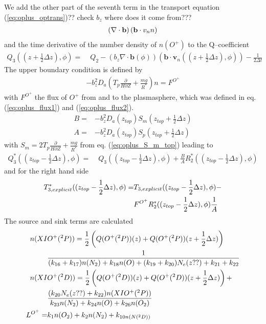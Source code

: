 %
We add the other part of the seventh term in the transport equation
(\ref{eq:oplus_optrans})?? check $b_z$ where does it come from???
%
\begin{align}
\left(\nabla \cdot
  \mathbf{b} \right)(\mathbf{b}\cdot{v}_n n) \notag
\end{align}
%
and the time derivative of the number density of $n(O^+)$ to the
Q--coefficient
%
\begin{align}
 Q_3((z+\frac{1}{2}\Delta z),\phi) = & \; Q_2 - (b_z \nabla \cdot
 \mathbf{b}(\phi))
 (\mathbf{b} \cdot \mathbf{v}_n((z+\frac{1}{2}\Delta z),\phi)) -
 \frac{1}{2 \Delta t}
\end{align}
%
The upper boundary condition is defined by
%
\begin{align}
  -b_z^2 D_a\left( T_p \frac{\partial}{H \partial Z} +
  \frac{mg}{R^*}\right) n = F^{O^+}
\end{align}
%
with $F^{O^+} $ the flux of $O^+$ from and to the plasmasphere,
which was defined in eq. (\ref{eq:oplus_flux1}) and
(\ref{eq:oplus_flux2}).
%
\begin{align}
  B = & -b_z^2 D_a(z_{top}) S_m(z_{top}+\frac{1}{2}\Delta z) \\
  A = & -b_z^2 D_a(z_{top}) S_p(z_{top}+\frac{1}{2}\Delta z)
\end{align}
%
with $S_m= 2 T_p \frac{\partial}{H \partial Z} +
  \frac{mg}{R^*}$ from eq. (\ref{eq:oplus_S_m_top}) leading to
%
\begin{align}
 Q_3^*((z_{top}-\frac{1}{2}\Delta z),\phi) = & \; Q_3((z_{top}-\frac{1}{2}\Delta z),\phi)
 + \frac{B}{A} R_2^*((z_{top}-\frac{1}{2}\Delta z),\phi)
\end{align}
%
and for the right hand side
%
\begin{align}
  T_{3,explicit}^*((z_{top}-\frac{1}{2}\Delta z),\phi) = & T_{3,explicit}((z_{top}-\frac{1}{2}\Delta
  z),\phi) - \notag \\
  {} &  F^{O^+}  R_2^*((z_{top}-\frac{1}{2}\Delta z),\phi)
  \frac{1}{A}
\end{align}
%
The source and sink terms are calculated
%
\begin{align}
  n(XI & O^+(^2P)) =  \frac{1}{2}\left( Q(O^+(^2P))(z) + Q(O^+(^2P))(z+\frac{1}{2} \Delta
  z)\right) \notag \\
  {} & \frac{1}{(k_{16} + k_{17})n(N_2) + k_{18} n(O) + (k_{19}+k_{20})N_e(z??) +
  k_{21}+k_{22}} \\
  n(XI & O^+(^2D)) =  \frac{1}{2}\left( Q(O^+(^2D))(z) + Q(O^+(^2D))(z+\frac{1}{2} \Delta
  z)\right) + \notag \\
  {} & \frac{(k_{20} N_e(z??)+ k_{22})n(XI
  O^+(^2P))}{k_{23}n(N_2)+k_{24}n(O)+k_{26}n(O_2)} \\
  L^{O^+} = & k_1 n(O_2) + k_2 n(N_2) + k_{10 n(N(^2D))}
\end{align}

